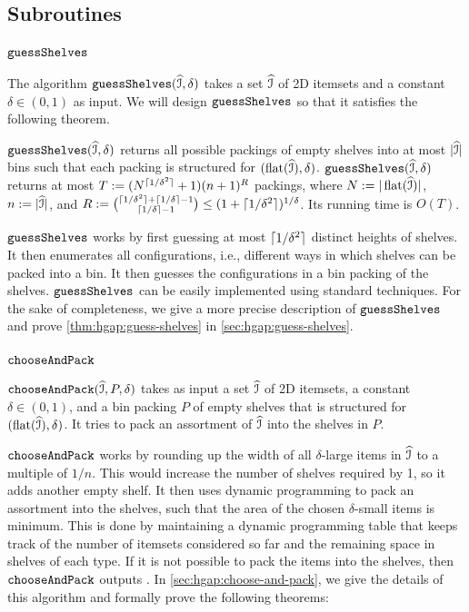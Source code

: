 \subsection{Subroutines}

\subsubsection{\texorpdfstring{$\operatorname{\mathtt{guessShelves}}$}{guess-shelves}}

The algorithm $\operatorname{\mathtt{guessShelves}}(\widehat{\mathcal{I}}, \delta)$ takes a set $\widehat{\mathcal{I}}$
of 2D itemsets and a constant $\delta \in (0, 1)$ as input.
We will design $\operatorname{\mathtt{guessShelves}}$ so that it satisfies the following theorem.
\begin{theorem}
\label{thm:hgap:guess-shelves}
$\operatorname{\mathtt{guessShelves}}(\widehat{\mathcal{I}}, \delta)$ returns all possible packings of empty shelves into at most
$|\widehat{\mathcal{I}}|$ bins such that each packing is structured for $(\operatorname{flat}(\widehat{\mathcal{I}}), \delta)$.
$\operatorname{\mathtt{guessShelves}}(\widehat{\mathcal{I}}, \delta)$ returns at most $T := (N^{\lceil 1/\delta^2 \rceil}+1)(n+1)^R$
packings, where $N := |\operatorname{flat}(\widehat{\mathcal{I}})|$, $n := |\widehat{\mathcal{I}}|$,
and $R := \binom{\lceil 1/\delta^2 \rceil + \left\lceil 1/\delta \right\rceil-1}{\left\lceil 1/\delta \right\rceil-1}
\le (1+\lceil 1/\delta^2 \rceil)^{1/\delta}$. Its running time is $O(T)$.
\end{theorem}
$\operatorname{\mathtt{guessShelves}}$ works by first guessing at most $\lceil 1/\delta^2 \rceil$ distinct heights of shelves.
It then enumerates all configurations, i.e.,
different ways in which shelves can be packed into a bin.
It then guesses the configurations in a bin packing of the shelves.
$\operatorname{\mathtt{guessShelves}}$ can be easily implemented using standard techniques.
For the sake of completeness, we give a more precise description of $\operatorname{\mathtt{guessShelves}}$
and prove \cref{thm:hgap:guess-shelves} in \cref{sec:hgap:guess-shelves}.

\subsubsection{\texorpdfstring{$\operatorname{\mathtt{chooseAndPack}}$}{choose-and-pack}}

$\operatorname{\mathtt{chooseAndPack}}(\widehat{\mathcal{I}}, P, \delta)$ takes as input a set $\widehat{\mathcal{I}}$ of 2D itemsets,
a constant $\delta \in (0, 1)$, and a bin packing $P$ of empty shelves that is
structured for $(\operatorname{flat}(\widehat{\mathcal{I}}), \delta)$.
It tries to pack an assortment of $\widehat{\mathcal{I}}$ into the shelves in $P$.

$\operatorname{\mathtt{chooseAndPack}}$ works by rounding up the width of all
$\delta$-large items in $\widehat{\mathcal{I}}$ to a multiple of $1/n$.
This would increase the number of shelves required by 1, so it adds another empty shelf.
It then uses dynamic programming to pack an assortment into the shelves,
such that the area of the chosen $\delta$-small items is minimum.
This is done by maintaining a dynamic programming table that keeps track of
the number of itemsets considered so far and
the remaining space in shelves of each type.
If it is not possible to pack the items into the shelves,
then $\operatorname{\mathtt{chooseAndPack}}$ outputs \Null.
In \cref{sec:hgap:choose-and-pack}, we give the details of this algorithm
and formally prove the following theorems:

